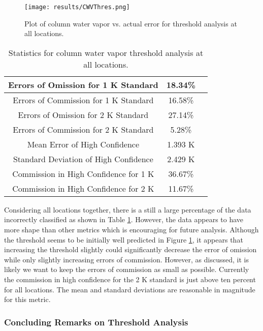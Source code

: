 \documentclass{book}
\begin{document}
\begin{minipage}[c]{0.5\linewidth}
\centering
\begin{figure}[H]
\texttt{[image: results/CWVThres.png]}
\caption{Plot of column water vapor vs. actual error for threshold analysis at all locations.}
\label{fig:CWVThres}
\end{figure}
\end{minipage}
\begin{minipage}[c]{0.5\linewidth}
\begin{table}[H]
\centering
\footnotesize
\begin{tabular}{ | c | c | c | } \hline
Errors of Omission for 1 K Standard & 18.34\% \\ \hline
Errors of Commission for 1 K Standard & 16.58\% \\ \hline
Errors of Omission for 2 K Standard & 27.14\% \\ \hline
Errors of Commission for 2 K Standard & 5.28\% \\ \hline
Mean Error of High Confidence & 1.393 K \\ \hline
Standard Deviation of High Confidence & 2.429 K \\ \hline
Commission in High Confidence for 1 K & 36.67\% \\ \hline
Commission in High Confidence for 2 K & 11.67\% \\ \hline
\end{tabular}
\caption{Statistics for column water vapor threshold analysis at all locations.}
\label{tab:CWVThres}
\end{table}
\end{minipage}

Considering all locations together, there is a still a large percentage of the data incorrectly classified as shown in Table \ref{tab:CWVThres}.  However, the data appears to have more shape than other metrics which is encouraging for future analysis.  Although the threshold seems to be initially well predicted in Figure \ref{fig:CWVThres}, it appears that increasing the threshold slightly could significantly decrease the error of omission while only slightly increasing errors of commission.  However, as discussed, it is likely we want to keep the errors of commission as small as possible.  Currently the commission in high confidence for the 2 K standard is just above ten percent for all locations.  The mean and standard deviations are reasonable in magnitude for this metric.

\subsubsection{Concluding Remarks on Threshold Analysis}
\end{document}
